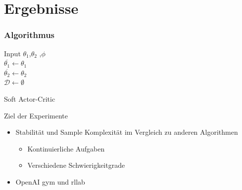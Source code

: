 \section{Ergebnisse}


\begin{frame}
    \frametitle{Algorithmus}
    \begin{algorithm}[H]
        {\small
        \SetAlgoLined
        Input $\theta_{1}$,$\theta_{2}$ ,$\phi$\\
        $\overline{\theta_{1}} \leftarrow  \theta_{1}$\\
        $\overline{\theta_{2}} \leftarrow \theta_{2}$\\
        $\mathcal{D} \leftarrow \emptyset$\\
        }
         \caption{Soft Actor-Critic}
        \end{algorithm}
     
\end{frame}

\begin{frame}{Ziel der Experimente}
        \begin{itemize}
            \item Stabilität und Sample Komplexität im Vergleich zu anderen Algorithmen
            \begin{itemize}
                \item Kontinuierliche Aufgaben
                \item Verschiedene Schwierigkeitgrade
            \end{itemize}  
            \item OpenAI gym und rllab
        \end{itemize}
\end{frame}

